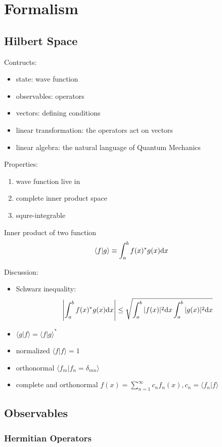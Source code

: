 \chapter{Formalism}
\section{Hilbert Space}
Contructs:
\begin{itemize}
	\item state: wave function
	\item observables: operators
	\item vectors: defining conditions
	\item linear transformation: the operators act on vectors
	\item linear algebra: the natural language of Quantum Mechanics
\end{itemize} 
Properties:
\begin{enumerate}
	\item wave function live in
	\item complete inner product space
	\item squre-integrable
\end{enumerate}
\begin{dfn}
	Inner product of two function 
	\[ 
	\langle f|g \rangle \equiv \int_a^b f(x)^*g(x) {\rm d}x
	\]
\end{dfn}
Discussion:
\begin{itemize}
	\item Schwarz inequality: \[
	\left| \int_a^b f(x)^*g(x) {\rm d}x \right| \leq 
	\sqrt{\int_a^b |f(x)|^2 {\rm d}x\int_a^b |g(x)|^2 {\rm d}x}
	\]
	\item \( \langle g|f \rangle = \langle f|g \rangle^* \)
	\item normalized \( \langle f|f \rangle = 1 \)
	\item orthonormal \( \langle f_m|f_n = \delta_{mn}\rangle \)
	\item complete and orthonormal \( f(x) = \sum_{n=1}^\infty c_nf_n(x),
	c_n=\langle f_n|f \rangle \)
\end{itemize}

\section{Observables}

\subsection{Hermitian Operators}

